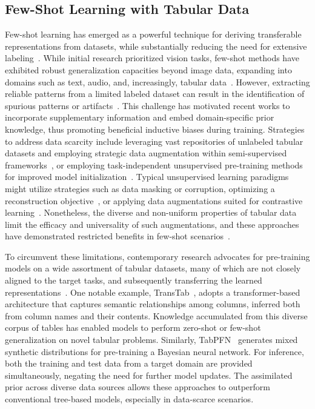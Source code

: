 \subsection{Few-Shot Learning with Tabular Data} Few-shot learning has emerged as a powerful technique for deriving transferable representations from datasets, while substantially reducing the need for extensive labeling~\cite{chen2018closer}. While initial research prioritized vision tasks, few-shot methods have exhibited robust generalization capacities beyond image data, expanding into domains such as text, audio, and, increasingly, tabular data~\cite{majumder2022few,nam2023stunt,schick2021exploiting}. However, extracting reliable patterns from a limited labeled dataset can result in the identification of spurious patterns or artifacts~\cite{bartlett2021deep}. This challenge has motivated recent works to incorporate supplementary information and embed domain-specific prior knowledge, thus promoting beneficial inductive biases during training. Strategies to address data scarcity include leveraging vast repositories of unlabeled tabular datasets and employing strategic data augmentation within semi-supervised frameworks~\cite{ucar2021subtab,yoon2020vime}, or employing task-independent unsupervised pre-training methods for improved model initialization~\cite{somepalli2021saint}. Typical unsupervised learning paradigms might utilize strategies such as data masking or corruption, optimizing a reconstruction objective~\cite{arik2021tabnet,majmundar2022met}, or applying data augmentations suited for contrastive learning~\cite{bahri2022scarf,chen2020simple}. Nonetheless, the diverse and non-uniform properties of tabular data limit the efficacy and universality of such augmentations, and these approaches have demonstrated restricted benefits in few-shot scenarios~\cite{nam2023stunt}. 

To circumvent these limitations, contemporary research advocates for pre-training models on a wide assortment of tabular datasets, many of which are not closely aligned to the target tasks, and subsequently transferring the learned representations~\cite{zhang2023generative,levin2022transfer,zhu2023xtab}. One notable example, TransTab~\cite{wang2022transtab}, adopts a transformer-based architecture that captures semantic relationships among columns, inferred both from column names and their contents. Knowledge accumulated from this diverse corpus of tables has enabled models to perform zero-shot or few-shot generalization on novel tabular problems. Similarly, TabPFN~\cite{hollmann2022tabpfn} generates mixed synthetic distributions for pre-training a Bayesian neural network. For inference, both the training and test data from a target domain are provided simultaneously, negating the need for further model updates. The assimilated prior across diverse data sources allows these approaches to outperform conventional tree-based models, especially in data-scarce scenarios.

